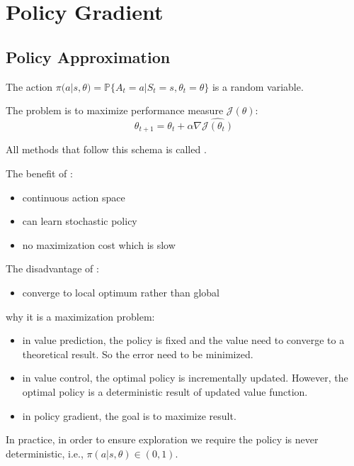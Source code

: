 \section{Policy Gradient}

\subsection{Policy Approximation}

The action $\pi(a|s, \theta ) = \mathbb{P}\{ A_t=a|S_t=s,\theta_t=\theta \}$ is a random variable. 


The problem is to maximize performance measure $\mathcal{J}(\theta)$:
\begin{equation}\label{maxperformancemeasure}
	\theta_{t+1} = \theta_t + \alpha \nabla \widehat{\mathcal{J}(\theta_t)}
\end{equation}

All methods that follow this schema is called . 

The benefit of :
\begin{itemize}
	\item continuous action space
	\item can learn stochastic policy
	\item no maximization cost which is slow
\end{itemize}

The disadvantage of :
\begin{itemize}
	\item converge to local optimum rather than global
\end{itemize}

why it is a maximization problem: 
\begin{itemize}
	\item in value prediction, the policy is fixed and the value need to converge to a theoretical result. So the error need to be minimized.
	\item in value control, the optimal policy is incrementally updated. However, the optimal policy is a deterministic result of updated value function.
	\item in policy gradient, the goal is to maximize result.
\end{itemize}



In practice, in order to ensure exploration we require the policy is never deterministic, i.e., $\pi(a|s, \theta) \in (0,1)$. 

